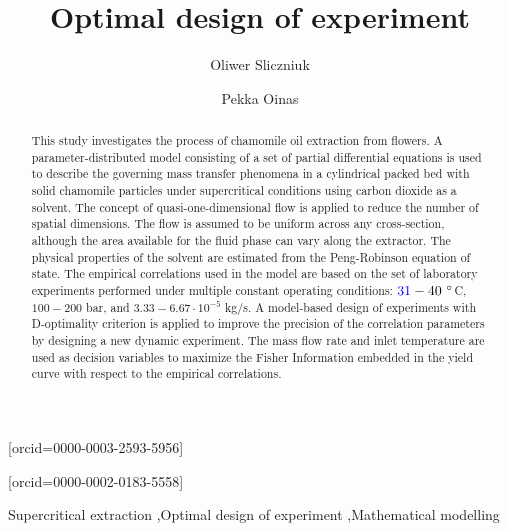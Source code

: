 \documentclass[a4paper,fleqn]{cas-dc}
\begin{document}
 

\title[mode=title]{Optimal design of experiment}                      


\author[1]{Oliwer Sliczniuk}[orcid=0000-0003-2593-5956]
\cormark[1]

\author[1]{Pekka Oinas}[orcid=0000-0002-0183-5558]


\address[1]{Aalto University, School of Chemical Engineering, Espoo, 02150, Finland}


\begin{abstract}
This study investigates the process of chamomile oil extraction from flowers. A parameter-distributed model consisting of a set of partial differential equations is used to describe the governing mass transfer phenomena in a{ \color{blue}cylindrical packed bed with solid chamomile particles} under supercritical conditions using carbon dioxide as a solvent. The concept of quasi-one-dimensional flow is applied to reduce the number of spatial dimensions. The flow is assumed to be uniform across any cross-section, although the area available for the fluid phase can vary along the extractor. The physical properties of the solvent are estimated from the Peng-Robinson equation of state. The empirical correlations used in the model are based on the set of laboratory experiments performed under multiple constant operating conditions: ${\color{blue}31} - 40~^\circ$C, $100 - 200$ bar, and $3.33-6.67 \cdot 10^{-5}$ kg/s. A model-based design of experiments with D-optimality criterion is applied to improve the precision of the correlation parameters by designing a new dynamic experiment. The mass flow rate and inlet temperature are used as decision variables to maximize the Fisher Information embedded in the yield curve with respect to the empirical correlations. 

\end{abstract}

\begin{keywords}
Supercritical extraction \sep Optimal design of experiment \sep Mathematical modelling
\end{keywords}
\end{document}
